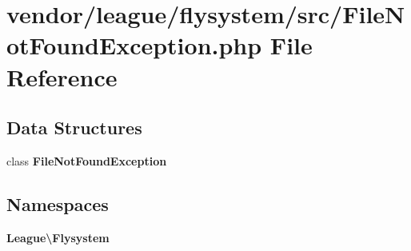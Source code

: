 \section{vendor/league/flysystem/src/\+File\+Not\+Found\+Exception.php File Reference}
\label{league_2flysystem_2src_2_file_not_found_exception_8php}
\subsection*{Data Structures}
\begin{DoxyCompactItemize}
\item 
class {\bf File\+Not\+Found\+Exception}
\end{DoxyCompactItemize}
\subsection*{Namespaces}
\begin{DoxyCompactItemize}
\item 
 {\bf League\textbackslash{}\+Flysystem}
\end{DoxyCompactItemize}
